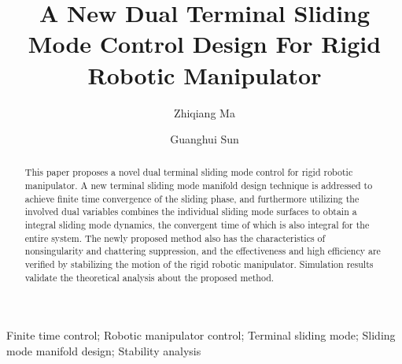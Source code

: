 \documentclass[3p]{elsarticle}
\theoremstyle{plain}
\theoremstyle{remark}
\begin{document}
\begin{frontmatter}
\title{A New Dual Terminal Sliding Mode Control Design For Rigid Robotic Manipulator}
\author{Zhiqiang Ma}
\author{Guanghui Sun}
\address{Research Institute of Intelligent Control and Systems, Harbin Institute of Technology, Harbin 150001, China}

\begin{abstract}
This paper proposes a novel dual terminal sliding mode control for rigid robotic manipulator. A new terminal sliding mode manifold design technique is addressed to achieve finite time convergence of the sliding phase, and furthermore utilizing the involved dual variables combines the individual sliding mode surfaces to obtain a integral sliding mode dynamics, the convergent time of which is also integral for the entire system. The newly proposed method also has the characteristics of nonsingularity and chattering suppression, and the effectiveness and high efficiency are verified by stabilizing the motion of the rigid robotic manipulator. Simulation results validate the theoretical analysis about the proposed method.
\end{abstract}
\begin{keyword}
Finite time control; Robotic manipulator control; Terminal sliding mode; Sliding mode manifold design; Stability analysis
\end{keyword}
\end{frontmatter}
\end{document}
